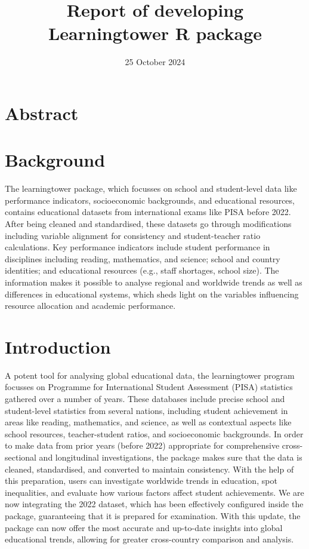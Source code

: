 \documentclass[
  11pt,
  a4paper,
]{article}
\title{Report of developing Learningtower R package}
\date{25 October 2024}
\author{\sf{\Large\textbf{Shabarish Sai Subramanian} \\\large Master of
Businss Analytics\\[0.5cm]}{\Large\textbf{Guan Ru, Chen} \\\large Master
of Businss Analytics\\[0.5cm]}}
\makeatletter
\def\maketitle{\front{\expandafter{\@title}}{\@author}{\@organization}}
\makeatother
\begin{document}
\maketitle

\section{Abstract}\label{abstract}

\section{Background}\label{background}

The learningtower package, which focusses on school and student-level
data like performance indicators, socioeconomic backgrounds, and
educational resources, contains educational datasets from international
exams like PISA before 2022. After being cleaned and standardised, these
datasets go through modifications including variable alignment for
consistency and student-teacher ratio calculations. Key performance
indicators include student performance in disciplines including reading,
mathematics, and science; school and country identities; and educational
resources (e.g., staff shortages, school size). The information makes it
possible to analyse regional and worldwide trends as well as differences
in educational systems, which sheds light on the variables influencing
resource allocation and academic performance.

\section{Introduction}\label{introduction}

A potent tool for analysing global educational data, the learningtower
program focusses on Programme for International Student Assessment
(PISA) statistics gathered over a number of years. These databases
include precise school and student-level statistics from several
nations, including student achievement in areas like reading,
mathematics, and science, as well as contextual aspects like school
resources, teacher-student ratios, and socioeconomic backgrounds. In
order to make data from prior years (before 2022) appropriate for
comprehensive cross-sectional and longitudinal investigations, the
package makes sure that the data is cleaned, standardised, and converted
to maintain consistency. With the help of this preparation, users can
investigate worldwide trends in education, spot inequalities, and
evaluate how various factors affect student achievements. We are now
integrating the 2022 dataset, which has been effectively configured
inside the package, guaranteeing that it is prepared for examination.
With this update, the package can now offer the most accurate and
up-to-date insights into global educational trends, allowing for greater
cross-country comparison and analysis.
\end{document}
